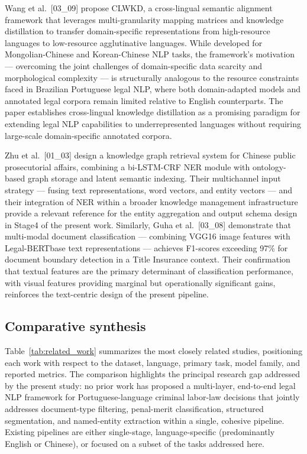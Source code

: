 \documentclass[preprint,a4paper,fleqn]{cas-dc}
\begin{document}
Wang et al.~[03\_09] propose CLWKD, a cross-lingual semantic alignment framework that leverages multi-granularity mapping matrices and knowledge distillation to transfer domain-specific representations from high-resource languages to low-resource agglutinative languages. While developed for Mongolian-Chinese and Korean-Chinese NLP tasks, the framework's motivation — overcoming the joint challenges of domain-specific data scarcity and morphological complexity — is structurally analogous to the resource constraints faced in Brazilian Portuguese legal NLP, where both domain-adapted models and annotated legal corpora remain limited relative to English counterparts. The paper establishes cross-lingual knowledge distillation as a promising paradigm for extending legal NLP capabilities to underrepresented languages without requiring large-scale domain-specific annotated corpora.

Zhu et al.~[01\_03] design a knowledge graph retrieval system for Chinese public prosecutorial affairs, combining a bi-LSTM-CRF NER module with ontology-based graph storage and latent semantic indexing. Their multichannel input strategy — fusing text representations, word vectors, and entity vectors — and their integration of NER within a broader knowledge management infrastructure provide a relevant reference for the entity aggregation and output schema design in Stage4 of the present work. Similarly, Guha et al.~[03\_08] demonstrate that multi-modal document classification — combining VGG16 image features with Legal-BERTbase text representations — achieves F1-scores exceeding 97\% for document boundary detection in a Title Insurance context. Their confirmation that textual features are the primary determinant of classification performance, with visual features providing marginal but operationally significant gains, reinforces the text-centric design of the present pipeline.

\subsection{Comparative synthesis}

Table~\ref{tab:related_work} summarizes the most closely related studies, positioning each work with respect to the dataset, language, primary task, model family, and reported metrics. The comparison highlights the principal research gap addressed by the present study: no prior work has proposed a multi-layer, end-to-end legal NLP framework for Portuguese-language criminal labor-law decisions that jointly addresses document-type filtering, penal-merit classification, structured segmentation, and named-entity extraction within a single, cohesive pipeline. Existing pipelines are either single-stage, language-specific (predominantly English or Chinese), or focused on a subset of the tasks addressed here.
\end{document}
